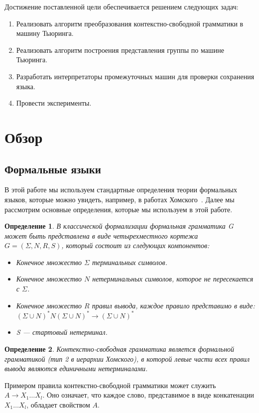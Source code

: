 \documentclass[14pt]{matmex-diploma-custom}
\newtheorem{defn}{Определение}[subsection]
\begin{document}
Достижение поставленной цели обеспечивается решением следующих задач:
    \begin{enumerate}
    \item Реализовать алгоритм преобразования контекстно-свободной грамматики в машину Тьюринга.
    \item Реализовать алгоритм построения представления группы по машине Тьюринга.
    \item Разработать интерпретаторы промежуточных машин для проверки сохранения языка.
    \item Провести эксперименты.
\end{enumerate}

\section{Обзор}
\subsection{Формальные языки}
В этой работе мы используем стандартные определения теории формальных языков, которые можно увидеть,
например, в работах Хомского~\cite{chomsky1, chomsky2}. 
Далее мы рассмотрим основные определения, которые мы используем в этой работе. 

\begin{defn}
В классической формализации формальная грамматика G может быть представлена 
в виде четырехместного кортежа $G = (\Sigma, N, R, S)$, который состоит из следующих компонентов:
\begin{itemize}
    \item Конечное множество $\Sigma$ терминальных символов.
    \item Конечное множество $N$ нетерминальных символов, которое не пересекается с $\Sigma$.
    \item Конечное множество $R$ правил вывода, каждое правило представимо в виде: 
    $(\Sigma \cup N)^{*}N(\Sigma \cup N)^{*} \to (\Sigma \cup N)^{*}$
    \item S --- стартовый нетерминал.
\end{itemize}
\end{defn}

\begin{defn}
Контекстно-свободная грамматика является формальной грамматикой
(тип 2 в иерархии Хомского), в которой левые части всех правил вывода 
являются единичными нетерминалами. 
\end{defn}

Примером правила контекстно-свободной грамматики может служить $A \to X_1 \dots X_l$.
Оно означает, что каждое слово, представимое в виде конкатенации $X_1 \dots X_l$, 
обладает свойством $A$.
\end{document}
